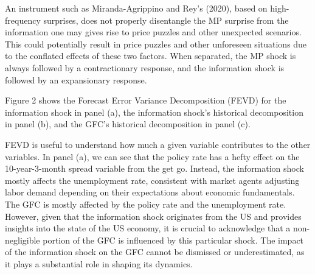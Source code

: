 \documentclass[11pt,a4paper]{article}
\begin{document}
An instrument such as Miranda-Agrippino and Rey's (2020), based on high-frequency surprises, does not properly disentangle the MP surprise from the information one may gives rise to price puzzles and other unexpected scenarios. This could potentially result in price puzzles and other unforeseen situations due to the conflated effects of these two factors. When separated, the MP shock is always followed by a contractionary response, and the information shock is followed by an expansionary response.
    

Figure 2 shows the Forecast Error Variance Decomposition (FEVD) for the information shock in panel (a), the information shock's historical decomposition in panel (b), and the GFC's historical decomposition in panel (c).

FEVD is useful to understand how much a given variable contributes to the other variables. In panel (a), we can see that the policy rate has a hefty effect on the 10-year-3-month spread variable from the get go. Instead, the information shock mostly affects the unemployment rate, consistent with market agents adjusting labor demand depending on their expectations about economic fundamentals.
The GFC is mostly affected by the policy rate and the unemployment rate. 
However, given that the information shock originates from the US and provides insights into the state of the US economy, it is crucial to acknowledge that a non-negligible portion of the GFC is influenced by this particular shock. The impact of the information shock on the GFC cannot be dismissed or underestimated, as it plays a substantial role in shaping its dynamics.

\end{document}
